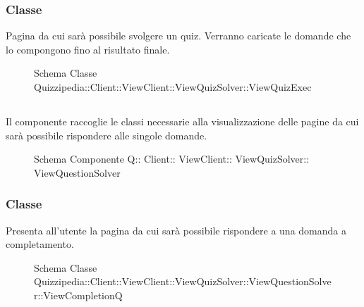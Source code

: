\subsubsection{Classe }
Pagina da cui sarà possibile svolgere un quiz. Verranno caricate le domande che lo compongono fino al risultato finale.
\begin{figure}[H]
\centering
\noindent{}
\caption[Schema Classe ViewQuizExec]{Schema Classe Quizzipedia::Client::ViewClient::ViewQuizSolver::ViewQuizExec}
\end{figure}
\subsection{}
Il componente raccoglie le classi necessarie alla visualizzazione delle pagine da cui sarà possibile rispondere alle singole domande.
\begin{figure}[H]
\centering
\noindent{}
\caption[Schema Componente Quizzipedia::Client::ViewClient::ViewQuizSolver::ViewQuestionSolver]{Schema Componente Q:: Client:: ViewClient:: ViewQuizSolver:: ViewQuestionSolver}
\end{figure}
\subsubsection{Classe }
Presenta all'utente la pagina da cui sarà possibile rispondere a una domanda a completamento.
\begin{figure}[H]
\centering
\noindent{}
\caption[Schema Classe ViewCompletionQ]{Schema Classe Quizzipedia::Client::ViewClient::ViewQuizSolver::ViewQuestionSolver::ViewCompletionQ}
\end{figure}
